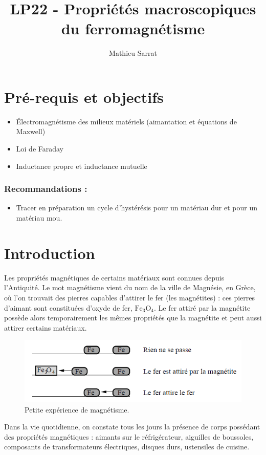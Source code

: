\documentclass[11pt,a4paper]{report}
\author{Mathieu Sarrat}
\title{LP22 - Propriétés macroscopiques du ferromagnétisme}
\begin{document}
\maketitle

\section*{Pré-requis et objectifs}
\begin{itemize}
	\item \'Electromagnétisme des milieux matériels (aimantation et équations de Maxwell)
	\item Loi de Faraday
	\item Inductance propre et inductance mutuelle
\end{itemize}

\subsubsection{Recommandations :}
\begin{itemize}
	\item Tracer en préparation un cycle d'hystérésis pour un matériau dur et pour un matériau mou.
\end{itemize}

\newpage
\section*{Introduction}

Les propriétés magnétiques de certains matériaux sont connues depuis l'Antiquité. Le mot magnétisme vient du nom de la ville de Magnésie, en Grèce, où l'on trouvait des pierres capables d'attirer le fer (les magnétites) : ces pierres d’aimant sont constituées d’oxyde de fer, $\text{Fe}_3\text{O}_4$. Le fer attiré par la magnétite possède alors temporairement les mêmes propriétés que la magnétite et peut aussi attirer certains matériaux.
\begin{figure}[h!]
\begin{center}
	\includegraphics[scale = 0.50]{magnetite.png}
	\caption{Petite expérience de magnétisme.} 
	\label{fig:magnetite}
\end{center}
\end{figure}
Dans la vie quotidienne, on constate tous les jours la présence de corps possédant des propriétés magnétiques : aimants sur le réfrigérateur, aiguilles de boussoles, composants de transformateurs électriques, disques durs, ustensiles de cuisine.\\
\end{document}
